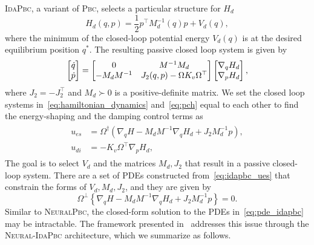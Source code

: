 \textsc{IdaPbc}, a variant of \textsc{Pbc}, selects a particular structure for
$H_d$ 
\begin{equation}
  H_d(q, p) = \frac{1}{2} p^\top M_d^{-1}(q) p + V_d(q),
  \label{eq:idapbc_desired_hamiltonian}
\end{equation}
\noindent where the minimum of the closed-loop potential energy $V_d(q)$ is at
the desired equilibrium position $q^*$.
%
The resulting passive closed loop system is given by~\cite{ortega2002stabilization}
\begin{equation}
  \begin{bmatrix}\dot{q} \\ \dot{p}\end{bmatrix}  =
  \begin{bmatrix}0 & M^{-1}M_d \\ -M_dM^{-1} & J_2(q,p) - \Omega K_v \Omega^\top\end{bmatrix}
  \begin{bmatrix}\nabla_q H_d \\ \nabla_p H_d\end{bmatrix},
  \label{eq:pch}
\end{equation}
where $J_2 = -J_2^\top$ and $M_d \succ 0$ is a positive-definite matrix.
%
We set the closed loop systems in~\eqref{eq:hamiltonian_dynamics}
and~\eqref{eq:pch} equal to each other to find the energy-shaping and the damping control terms as
\begin{align}
  \begin{split}
  u_{es} &= \Omega^{\dagger} \left(\nabla_qH - M_dM^{-1} \nabla_qH_d + J_2M_d^{-1}p\right), \\
  u_{di} &= -K_v \Omega^\top \nabla_p H_d,
  \end{split}
  \label{eq:idapbc_ues}
\end{align}
%
The goal is to select $V_d$ and the matrices $M_d, J_2$ that result in a passive
closed-loop system.
%
There are a set of PDEs constructed from~\eqref{eq:idapbc_ues} that constrain
the forms of $V_d, M_d, J_2$, and they are given by 
\begin{equation}
  \Omega^\perp \left\{ \nabla_qH - M_dM^{-1} \nabla_qH_d + J_2M_d^{-1}p \right\} = 0.
  \label{eq:pde_idapbc}
\end{equation}
%
Similar to \textsc{NeuralPbc}, the closed-form solution to the PDEs
in~\eqref{eq:pde_idapbc} may be intractable. 
%
The framework presented in~\cite{sirichotiyakul2022data} addresses this issue
through the \textsc{Neural-IdaPbc} architecture, which we summarize as follows.


